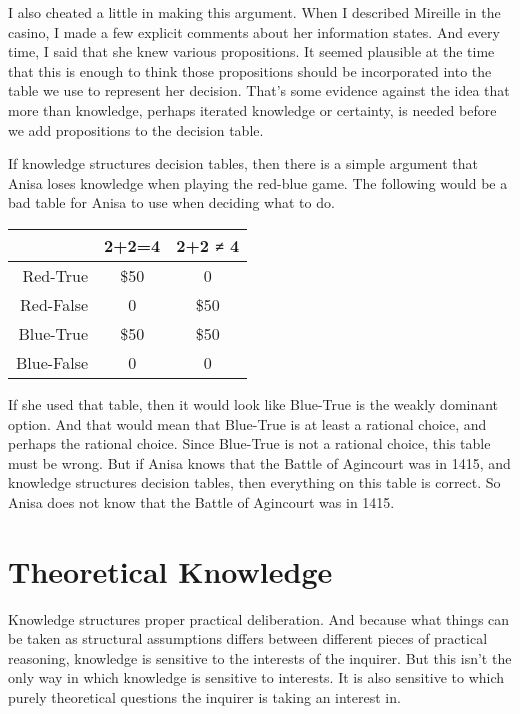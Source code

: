 \documentclass[
  11pt,
]{book}
\begin{document}
I also cheated a little in making this argument. When I described Mireille in the casino, I made a few explicit comments about her information states. And every time, I said that she knew various propositions. It seemed plausible at the time that this is enough to think those propositions should be incorporated into the table we use to represent her decision. That's some evidence against the idea that more than knowledge, perhaps iterated knowledge or certainty, is needed before we add propositions to the decision table.

If knowledge structures decision tables, then there is a simple argument that Anisa loses knowledge when playing the red-blue game. The following would be a bad table for Anisa to use when deciding what to do.

\begin{longtable}[]{@{}rcc@{}}
\toprule\noalign{}
~ & 2+2=4 & 2+2 ≠ 4 \\
\midrule\noalign{}
\endhead
\bottomrule\noalign{}
\endlastfoot
Red-True & \$50 & 0 \\
Red-False & 0 & \$50 \\
Blue-True & \$50 & \$50 \\
Blue-False & 0 & 0 \\
\end{longtable}

If she used that table, then it would look like Blue-True is the weakly dominant option. And that would mean that Blue-True is at least a rational choice, and perhaps the rational choice. Since Blue-True is not a rational choice, this table must be wrong. But if Anisa knows that the Battle of Agincourt was in 1415, and knowledge structures decision tables, then everything on this table is correct. So Anisa does not know that the Battle of Agincourt was in 1415.

\hypertarget{theoreticalknowledge}{%
\section{Theoretical Knowledge}\label{theoreticalknowledge}}

Knowledge structures proper practical deliberation. And because what things can be taken as structural assumptions differs between different pieces of practical reasoning, knowledge is sensitive to the interests of the inquirer. But this isn't the only way in which knowledge is sensitive to interests. It is also sensitive to which purely theoretical questions the inquirer is taking an interest in.
\end{document}
